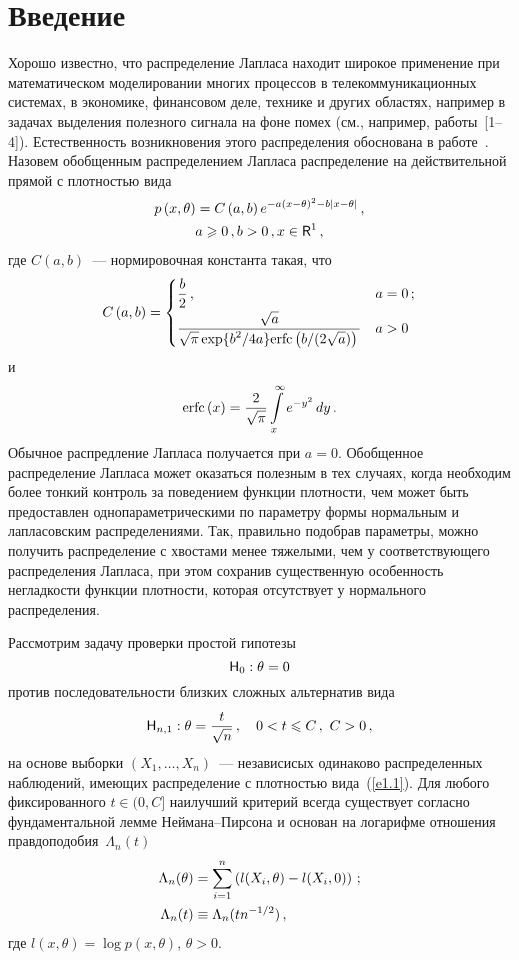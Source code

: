       \begin{multicols}{2}

      \label{st\stat}
      
\section{Введение}

Хорошо известно, что распределение Лапласа находит широкое
применение при математическом моделировании многих процессов в
телекоммуникационных системах, в экономике, финансовом деле,
технике и других областях, например в задачах выделения полезного
сигнала на фоне помех (см., например, работы~[1--4]). 
Естественность возникновения этого распределения обоснована
в работе~\cite{9be}. Назовем обобщенным распределением Лапласа
распределение на действительной прямой с плотностью вида
\begin{multline}
p\left(x, \theta\right) = C \left(a,b\right)e^{-a(x -
\theta)^{2} -b\left|x - \theta\right|}\,,\\
a \ge 0\,, b> 0\,,  x\in {\sf R}^{1}\,, 
\label{e1.1}
\end{multline}
где $C\left(a,b\right)$~--- нормировочная константа такая,
что
$$
C\left(a,b\right)=
\begin{cases}
\displaystyle\frac{\displaystyle b\mathstrut}{\displaystyle 2\mathstrut}\,, & a = 0\,; \\ 
\displaystyle\frac{\displaystyle \sqrt{a}\mathstrut}{\displaystyle \sqrt{\pi }
\exp\{b^{2} /4a\}{\mathrm{erfc}}\left(b/(2\sqrt{a})\right)\mathstrut}& a> 0 
\end{cases}
$$
и
$$
{\mathrm{erfc}}\left(x\right)=\displaystyle\frac{\displaystyle 2\mathstrut}{\displaystyle \sqrt{\pi } \mathstrut}
\int\limits_{x}^{\infty }e^{-y^{2}}\,dy\,.
$$
Обычное распредление Лапласа получается при $a=0$. Обобщенное
распределение Лапласа может оказаться полезным в тех случаях,
когда необходим более тонкий контроль за поведением функции
плотности, чем может быть предоставлен однопараметрическими по
параметру формы нормальным и лапласовским распределениями. Так,
правильно подобрав параметры, можно получить распределение с
хвостами менее тяжелыми, чем у соответствующего распределения
Лапласа, при этом сохранив существенную особенность негладкости
функции плотности, которая отсутствует у нормального распределения.

Рассмотрим задачу проверки простой гипотезы
$$
{\sf H}_0:\theta = 0
$$
против последовательности близких сложных альтернатив вида
$$
{\sf H}_{n,1}:\theta = \displaystyle\frac{\displaystyle t\mathstrut}{\displaystyle \sqrt{n}\mathstrut}\,, \quad
 0 < t \leqslant C\,,\  C > 0\,,
$$
на основе выборки $(X_1,\ldots,X_n)$~--- независисых одинаково
распределенных наблюдений, имеющих распределение с плотностью вида~(\ref{e1.1}). 
Для любого фиксированного $t \in (0,C]$ наилучший
критерий всегда существует согласно фундаментальной лемме
Неймана--Пирсона и основан на логарифме отношения правдоподобия~$\Lambda_n(t)$
\begin{align}
\Lambda_n(\theta) &=\sum\limits_{i=1}^{n}\left(l(X_i,\theta) - l(X_i,0)\right)\,; 
\label{e1.2}
\\
\Lambda_n(t) &\equiv\Lambda_n(t n^{-1/2})\,,\notag
\end{align}
где $l(x,\theta)=\log p(x,\theta)$, $\theta>0$.


\end{multicols}
